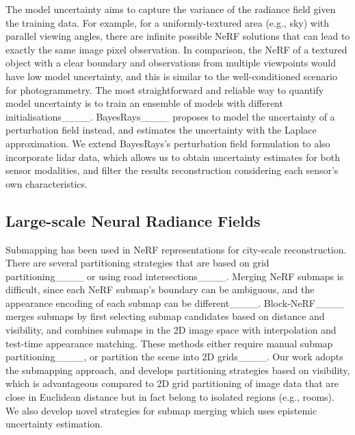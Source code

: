 The model uncertainty aims to capture the variance of the radiance field given the training data. For example, for a uniformly-textured area (e.g., sky) with parallel viewing angles, there are infinite possible NeRF solutions that can lead to exactly the same image pixel observation. In comparison, the NeRF of a textured object with a clear boundary and observations from multiple viewpoints would have low model uncertainty, and this is similar to the well-conditioned scenario for photogrammetry. The most straightforward and reliable way to quantify model uncertainty is to train an ensemble of models with different initialisations____. BayesRays____ proposes to model the uncertainty of a perturbation field instead, and estimates the uncertainty with the Laplace approximation. We extend BayesRays's perturbation field formulation to also incorporate lidar data, which allows us to obtain uncertainty estimates for both sensor modalities, and filter the results reconstruction considering each sensor's own characteristics.


\subsection{Large-scale Neural Radiance Fields}

Submapping has been used in NeRF representations for city-scale reconstruction. There are several partitioning strategies that are based on grid partitioning____ or using road intersections____. Merging NeRF submaps is difficult, since each NeRF submap's boundary can be ambiguous, and the appearance encoding of each submap can be different____. %
Block-NeRF____ merges submaps by first selecting submap candidates based on distance and visibility, and combines submaps in the 2D image space with interpolation and test-time appearance matching. These methods either require manual submap partitioning____, or partition the scene into 2D grids____. Our work adopts the submapping approach, and develops partitioning strategies based on visibility, which is advantageous compared to 2D grid partitioning of image data that are close in Euclidean distance but in fact belong to isolated regions (e.g., rooms). We also develop novel strategies for submap merging which uses epistemic uncertainty estimation. 





